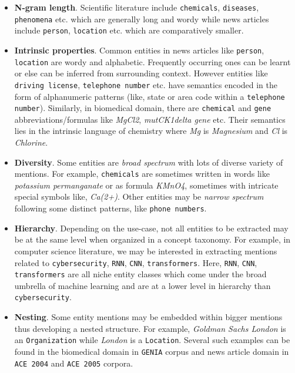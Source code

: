 \begin{itemize}
    \item \textbf{N-gram length}. Scientific literature include \texttt{chemicals}, \texttt{diseases}, \texttt{phenomena} etc. which are generally long and wordy while news articles include \texttt{person}, \texttt{location} etc. which are comparatively smaller. 
    
    \item \textbf{Intrinsic properties}. Common entities in news articles like \texttt{person}, \texttt{location} are wordy and alphabetic. Frequently occurring ones can be learnt or else can be inferred from surrounding context. However entities like \texttt{driving license}, \texttt{telephone number} etc. have semantics encoded in the form of alphanumeric patterns (like, state or area code within a \texttt{telephone number}). Similarly, in biomedical domain, there are \texttt{chemical} and \texttt{gene} abbreviations/formulas like \textit{MgCl2}, \textit{mutCK1delta gene} etc. Their semantics lies in the intrinsic language of chemistry where \textit{Mg} is \textit{Magnesium} and \textit{Cl} is \textit{Chlorine}.
    
    \item \textbf{Diversity}. Some entities are \textit{broad spectrum} with lots of diverse variety of mentions. For example, \texttt{chemicals} are sometimes written in words like \textit{potassium permanganate} or as formula \textit{KMnO4}, sometimes with intricate special symbols like, \textit{Ca(2+)}. Other entities may be \textit{narrow spectrum} following some distinct patterns, like \texttt{phone numbers}. 
    
    \item \textbf{Hierarchy}. Depending on the use-case, not all entities to be extracted may be at the same level when organized in a concept taxonomy. For example, in computer science literature, we may be interested in extracting mentions related to \texttt{cybersecurity}, \texttt{RNN}, \texttt{CNN}, \texttt{transformers}. Here, \texttt{RNN}, \texttt{CNN}, \texttt{transformers} are all niche entity classes which come under the broad umbrella of machine learning and are at a lower level in hierarchy than \texttt{cybersecurity}.
    
    \item \textbf{Nesting}. Some entity mentions may be embedded within bigger mentions thus developing a nested structure. For example, \textit{Goldman Sachs London} is an \texttt{Organization} while \textit{London} is a \texttt{Location}. Several such examples can be found in the biomedical domain in \texttt{GENIA} corpus\cite{kim2003genia} and news article domain in \texttt{ACE 2004}\cite{mitchell2005ace} and \texttt{ACE 2005}\cite{walker2006ace} corpora.
    

\end{itemize}
